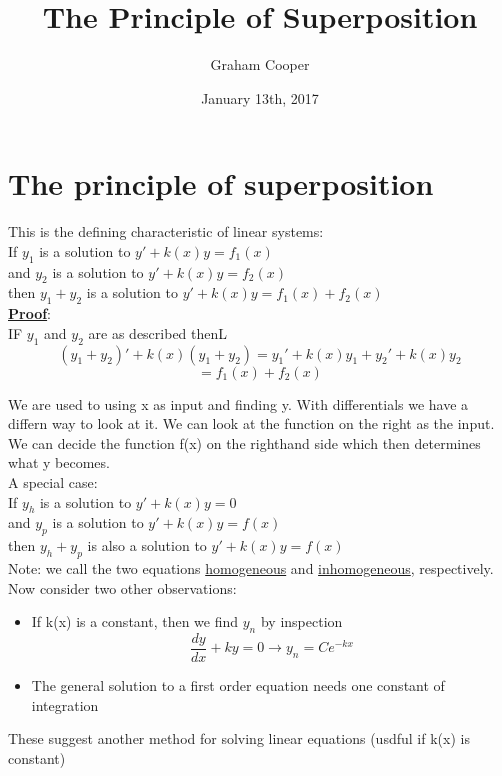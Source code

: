 \documentclass[12pt]{article}
\title{\vspace{-15ex}The Principle of Superposition\vspace{-1ex}}
\date{January 13th, 2017}
\author{Graham Cooper}
\newcommand{\myt}[1]{\textbf{\underline{#1}}}
\begin{document}
	\maketitle
	
	\section*{The principle of superposition}
	This is the defining characteristic of linear systems:\\
	If $y_1$ is a solution to $y' + k(x)y = f_1(x)$\\
	and $y_2$ is a solution to $y' + k(x)y = f_2(x)$\\
	then $y_1 + y_2$ is a solution to $y' + k(x)y = f_1(x) + f_2(x)$\\
	
	\myt{Proof}:\\
	IF $y_1$ and $y_2$ are as described thenL\\
	$$(y_1 + y_2)' + k(x)(y_1 + y_2) = y_1'+k(x)y_1 + y_2' + k(x)y_2$$
	$$ = f_1(x) + f_2(x)$$
	
	We are used to using x as input and finding y. With differentials we have a differn way to look at it. We can look at the function on the right as the input. We can decide the function f(x) on the righthand side which then determines what y becomes.\\
	
	A special case:\\
	If $y_h$ is a solution to $y' + k(x)y = 0$\\
	and $y_p$ is a solution to $y' + k(x)y = f(x)$\\
	then $y_h + y_p$ is also a solution to $y' + k(x)y = f(x)$\\
	
	Note: we call the two equations \underline{homogeneous} and \underline{inhomogeneous}, respectively.\\
	
	Now consider two other observations:\\
	\begin{itemize}
		\item If k(x) is a constant, then we find $y_n$ by inspection
		$$\frac{dy}{dx} + ky = 0 \rightarrow y_n = Ce^{-kx}$$
		\item The general solution to a first order equation needs one constant of integration
	\end{itemize}

	These suggest another method for solving linear equations (usdful if k(x) is constant)\\
	
\end{document}
